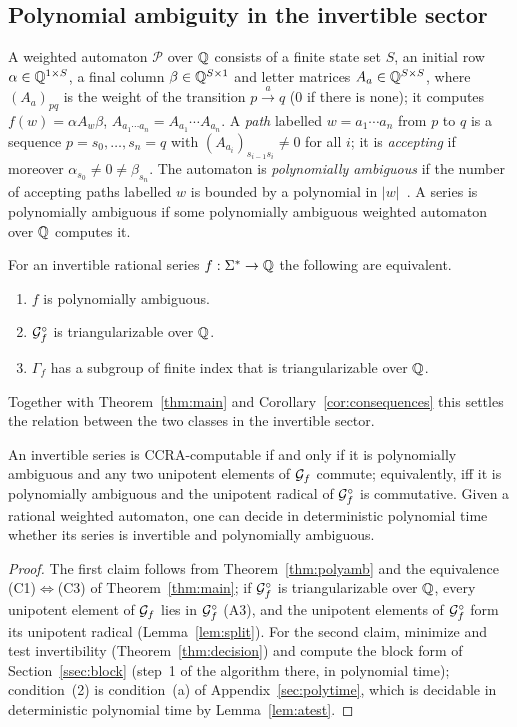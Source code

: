 \subsection{Polynomial ambiguity in the invertible sector}\label{ssec:polyamb}
A weighted automaton $\mathcal P$ over $\mathbb{Q}$ consists of a finite state set $S$, an initial row
$\alpha\in\mathbb{Q}^{1\times S}$, a final column $\beta\in\mathbb{Q}^{S\times 1}$ and letter matrices
$A_a\in\mathbb{Q}^{S\times S}$, where $(A_a)_{pq}$ is the weight of the transition $p\xrightarrow{a}q$
($0$ if there is none); it computes $f(w)=\alpha A_w\beta$, $A_{a_1\cdots a_n}=A_{a_1}\cdots A_{a_n}$.
A \emph{path} labelled $w=a_1\cdots a_n$ from $p$ to $q$ is a sequence $p=s_0,\ldots,s_n=q$ with
$(A_{a_i})_{s_{i-1}s_i}\ne0$ for all $i$; it is \emph{accepting} if moreover $\alpha_{s_0}\ne0\ne\beta_{s_n}$.
The automaton is \emph{polynomially ambiguous} if the number of accepting paths labelled $w$ is
bounded by a polynomial in $|w|$~\cite{MPS26,PS24}. A series is polynomially ambiguous if some
polynomially ambiguous weighted automaton over $\mathbb{Q}$ computes it.

\begin{theorem}\label{thm:polyamb}
For an invertible rational series $f:\Sigma^*\to\mathbb{Q}$ the following are equivalent.
\begin{enumerate}
\item $f$ is polynomially ambiguous.
\item $\mathcal{G}_f^\circ$ is triangularizable over $\mathbb{Q}$.
\item $\Gamma_f$ has a subgroup of finite index that is triangularizable over $\mathbb{Q}$.
\end{enumerate}
\end{theorem}

Together with Theorem~\ref{thm:main} and Corollary~\ref{cor:consequences} this settles the
relation between the two classes in the invertible sector.

\begin{corollary}\label{cor:polyamb}
An invertible series is CCRA-computable if and only if it is polynomially ambiguous and any two
unipotent elements of $\mathcal{G}_f$ commute; equivalently, iff it is polynomially ambiguous and the
unipotent radical of $\mathcal{G}_f^\circ$ is commutative. Given a rational weighted automaton, one can
decide in deterministic polynomial time whether its series is invertible and polynomially ambiguous.
\end{corollary}
\begin{proof}
The first claim follows from Theorem~\ref{thm:polyamb} and the equivalence (C1)$\Leftrightarrow$(C3) of
Theorem~\ref{thm:main}; if $\mathcal{G}_f^\circ$ is triangularizable over $\mathbb{Q}$, every unipotent
element of $\mathcal{G}_f$ lies in $\mathcal{G}_f^\circ$ (A3), and the unipotent elements of $\mathcal{G}_f^\circ$ form its
unipotent radical (Lemma~\ref{lem:split}). For the second claim, minimize and test invertibility
(Theorem~\ref{thm:decision}) and compute the block form of Section~\ref{ssec:block} (step~1 of the
algorithm there, in polynomial time); condition~(2) is condition~(a) of Appendix~\ref{sec:polytime}, which
is decidable in deterministic polynomial time by Lemma~\ref{lem:atest}.
\end{proof}


